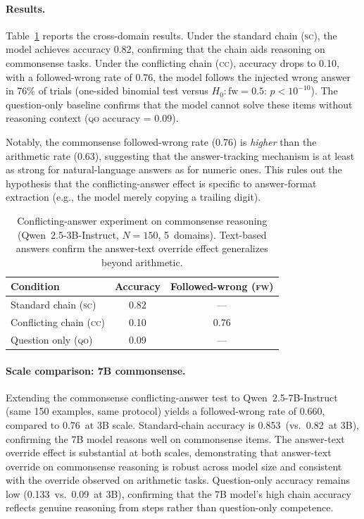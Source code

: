 \documentclass{article}
\theoremstyle{definition}
\theoremstyle{definition}
\newcommand{\CCFW}{0.63}
\newcommand{\CSSCACC}{0.82}
\newcommand{\CSCCACC}{0.10}
\newcommand{\CSCCFW}{0.76}
\newcommand{\CSQOACC}{0.09}
\newcommand{\CSPVAL}{$p{<}10^{-10}$}
\newcommand{\CSQWSCACC}{0.853}
\newcommand{\CSQWCCFW}{0.660}
\newcommand{\CSQWQOACC}{0.133}
\newcommand{\CSQWN}{150}
\begin{document}
\paragraph{Results.}
Table~\ref{tab:commonsense} reports the cross-domain results.
Under the standard chain (\textsc{sc}), the model achieves accuracy
\CSSCACC, confirming that the chain aids reasoning on commonsense tasks.
Under the conflicting chain (\textsc{cc}), accuracy drops to \CSCCACC,
with a followed-wrong rate of \CSCCFW, the model follows the injected
wrong answer in 76\% of trials (one-sided binomial test versus
$H_0\colon \text{fw}{=}0.5$: \CSPVAL). The question-only baseline
confirms that the model cannot solve these items without reasoning context
(\textsc{qo} accuracy = \CSQOACC).

Notably, the commonsense followed-wrong rate (\CSCCFW) is \emph{higher}
than the arithmetic rate (\CCFW), suggesting that the answer-tracking
mechanism is at least as strong for natural-language answers as for
numeric ones. This rules out the hypothesis that the conflicting-answer
effect is specific to answer-format extraction (e.g., the model merely
copying a trailing digit).

\begin{table}[h]
\centering
\caption{Conflicting-answer experiment on commonsense reasoning
  (Qwen~2.5-3B-Instruct, $N{=}150$, 5~domains). Text-based answers
  confirm the answer-text override effect generalizes beyond arithmetic.}
\label{tab:commonsense}
\begin{tabular}{lcc}
\toprule
Condition & Accuracy & Followed-wrong (\textsc{fw}) \\
\midrule
Standard chain (\textsc{sc})    & \CSSCACC & --- \\
Conflicting chain (\textsc{cc}) & \CSCCACC & \CSCCFW \\
Question only (\textsc{qo})     & \CSQOACC & --- \\
\bottomrule
\end{tabular}
\end{table}

\paragraph{Scale comparison: 7B commonsense.}
Extending the commonsense conflicting-answer test to Qwen~2.5-7B-Instruct
(same \CSQWN{} examples, same protocol) yields a followed-wrong rate of
\CSQWCCFW, compared to \CSCCFW\ at 3B scale.
Standard-chain accuracy is \CSQWSCACC\ (vs.\ \CSSCACC\ at 3B),
confirming the 7B model reasons well on commonsense items.
The answer-text override effect is substantial at both scales, demonstrating
that answer-text override on commonsense reasoning is robust across model
size and consistent with the override observed on arithmetic tasks.
Question-only accuracy remains low (\CSQWQOACC\ vs.\ \CSQOACC\ at 3B),
confirming that the 7B model's high chain accuracy reflects genuine
reasoning from steps rather than question-only competence.
\end{document}
